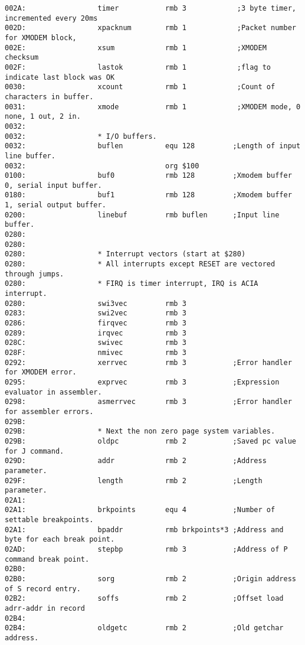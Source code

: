 {\begin{verbatim}
002A:                 timer           rmb 3            ;3 byte timer, incremented every 20ms
002D:                 xpacknum        rmb 1            ;Packet number for XMODEM block,
002E:                 xsum            rmb 1            ;XMODEM checksum
002F:                 lastok          rmb 1            ;flag to indicate last block was OK
0030:                 xcount          rmb 1            ;Count of characters in buffer.
0031:                 xmode           rmb 1            ;XMODEM mode, 0 none, 1 out, 2 in.
0032:                 
0032:                 * I/O buffers.
0032:                 buflen          equ 128         ;Length of input line buffer.
0032:                                 org $100
0100:                 buf0            rmb 128         ;Xmodem buffer 0, serial input buffer.
0180:                 buf1            rmb 128         ;Xmodem buffer 1, serial output buffer.
0200:                 linebuf         rmb buflen      ;Input line buffer.
0280:                 
0280:                 
0280:                 * Interrupt vectors (start at $280)
0280:                 * All interrupts except RESET are vectored through jumps.
0280:                 * FIRQ is timer interrupt, IRQ is ACIA interrupt.
0280:                 swi3vec         rmb 3
0283:                 swi2vec         rmb 3
0286:                 firqvec         rmb 3
0289:                 irqvec          rmb 3
028C:                 swivec          rmb 3
028F:                 nmivec          rmb 3
0292:                 xerrvec         rmb 3           ;Error handler for XMODEM error.
0295:                 exprvec         rmb 3           ;Expression evaluator in assembler.
0298:                 asmerrvec       rmb 3           ;Error handler for assembler errors.
029B:                 
029B:                 * Next the non zero page system variables.
029B:                 oldpc           rmb 2           ;Saved pc value for J command.
029D:                 addr            rmb 2           ;Address parameter.
029F:                 length          rmb 2           ;Length parameter.
02A1:                 
02A1:                 brkpoints       equ 4           ;Number of settable breakpoints. 
02A1:                 bpaddr          rmb brkpoints*3 ;Address and byte for each break point.
02AD:                 stepbp          rmb 3           ;Address of P command break point.
02B0:                 
02B0:                 sorg            rmb 2           ;Origin address of S record entry.
02B2:                 soffs           rmb 2           ;Offset load adrr-addr in record
02B4:                 
02B4:                 oldgetc         rmb 2           ;Old getchar address.

\end{verbatim}}
